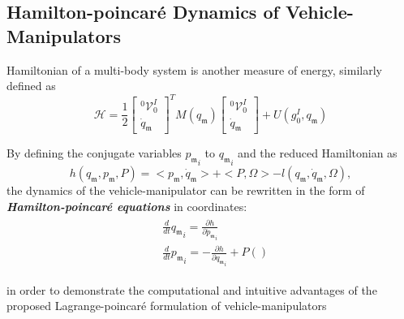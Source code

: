 \documentclass[lettersize,journal]{IEEEtran}
\def \m  {\mathfrak{m}}
\def \V {\mathcal{V}}
\theoremstyle{remark}
\begin{document}
\subsection{Hamilton-poincar\'{e} Dynamics of Vehicle-Manipulators}
Hamiltonian of a multi-body system is another measure of energy, similarly defined as
\begin{equation}
    \mathcal{H}=\frac{1}{2}\begin{bmatrix}^0\V^I_0 \\ \dot{q}_\mathfrak{m}\end{bmatrix}^T M(q_\mathfrak{m}) \begin{bmatrix}^0\V^I_0\\\dot{q}_\mathfrak{m}\end{bmatrix}+U(g^I_0,q_\m)
\end{equation}

By defining the conjugate variables ${p_\m}_i$ to ${q_\m}_i$ and the reduced Hamiltonian as
\begin{equation}
    h(q_\m,p_\m,P)=<p_\m,\dot{q}_\m>+<P,\Omega>-l(q_\m,\dot{q}_\m,\Omega),
\end{equation}
the dynamics of the vehicle-manipulator can be rewritten in the form of \textbf{\textit{Hamilton-poincar\'{e} equations}} in coordinates:
\begin{align}
    \begin{split}
    &\frac{d}{dt}{q_\m}_i=\frac{\partial h}{\partial{\dot{p}_\m}_i}\\
    &\frac{d}{dt}{p_\m}_i=-\frac{\partial h}{\partial {q_\m}_i}+P()
    \end{split}
\end{align}


 in order to demonstrate the computational and intuitive advantages of the proposed Lagrange-poincar\'{e} formulation of vehicle-manipulators

\appendix
\label{app:connection}
\end{document}
